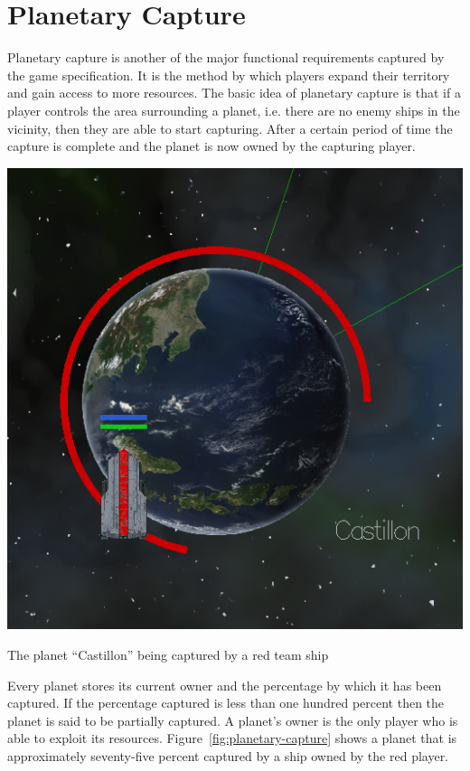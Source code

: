 \section{Planetary Capture}

Planetary capture is another of the major functional requirements captured by the
game specification. It is the method by which players expand their territory and
gain access to more resources. The basic idea of planetary capture is that if a
player controls the area surrounding a planet, i.e. there are no enemy ships in the
vicinity, then they are able to start capturing. After a certain period of time
the capture is complete and the planet is now owned by the capturing player.

\begin{marginfigure}
	\includegraphics{res/planetary_capture}
	\caption[An example of planetary capture in Project Serenity]{The planet ``Castillon'' being captured by a red team ship}
	\label{fig:planetary-capture}
\end{marginfigure}

Every planet stores its current owner and the percentage by which it has been captured.
If the percentage captured is less than one hundred percent then the planet is said
to be partially captured. A planet's owner is the only player who is able to exploit
its resources. Figure~\ref{fig:planetary-capture} shows a planet that is approximately
seventy-five percent captured by a ship owned by the red player.

